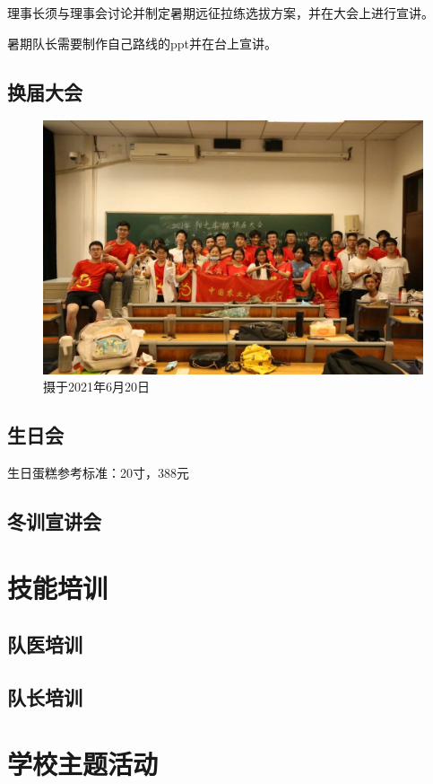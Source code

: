 \documentclass{ctexbook}
\begin{document}
   理事长须与理事会讨论并制定暑期远征拉练选拔方案，并在大会上进行宣讲。

   暑期队长需要制作自己路线的ppt并在台上宣讲。
\subsection{换届大会}
\begin{figure}[H]
    \centering
    \includegraphics[width=0.7\linewidth]{fig/换届大会.jpg}
    \caption{摄于2021年6月20日}
    \label{fig:}
\end{figure}
\subsection{生日会}
生日蛋糕参考标准：20寸，388元

\subsection{冬训宣讲会}

\section{技能培训}
\subsection{队医培训}
\subsection{队长培训}

\section{学校主题活动}
\end{document}
